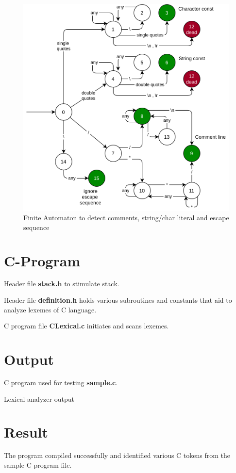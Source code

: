 \begin{figure}[H]
	\centering
	\includegraphics[width=\textwidth]{../EXP1/char-stream.png}
	\caption{Finite Automaton to detect comments, string/char literal and escape sequence}
\end{figure}


\section{C-Program}
Header file \textbf{stack.h} to stimulate stack.


\vspace{0.5cm}
Header file \textbf{definition.h} holds various subroutines and constants that aid to analyze lexemes of C language.


\vspace{0.5cm}
C program file \textbf{CLexical.c} initiates and scans lexemes.



\section{Output}
C program used for testing \textbf{sample.c}.


\vspace{0.5cm}
Lexical analyzer output


\section{Result}
The program compiled successfully and identified various C tokens from the sample C program file.